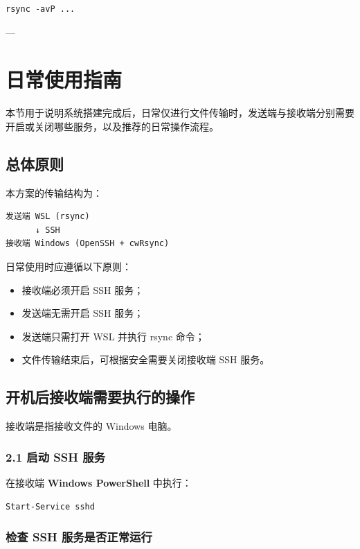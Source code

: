 \documentclass[UTF8]{ctexart}
\begin{document}
\begin{lstlisting}
rsync -avP ...
\end{lstlisting}

---
\section{日常使用指南}

本节用于说明系统搭建完成后，日常仅进行文件传输时，发送端与接收端分别需要开启或关闭哪些服务，以及推荐的日常操作流程。

\subsection{总体原则}

本方案的传输结构为：

\begin{lstlisting}
发送端 WSL (rsync)
      ↓ SSH
接收端 Windows (OpenSSH + cwRsync)
\end{lstlisting}

日常使用时应遵循以下原则：

\begin{itemize}
    \item 接收端必须开启 SSH 服务；
    \item 发送端无需开启 SSH 服务；
    \item 发送端只需打开 WSL 并执行 rsync 命令；
    \item 文件传输结束后，可根据安全需要关闭接收端 SSH 服务。
\end{itemize}

\subsection{开机后接收端需要执行的操作}

接收端是指接收文件的 Windows 电脑。

\subsubsection{2.1 启动 SSH 服务}

在接收端 \textbf{Windows PowerShell} 中执行：

\begin{lstlisting}
Start-Service sshd
\end{lstlisting}

\subsubsection{检查 SSH 服务是否正常运行}
\end{document}
